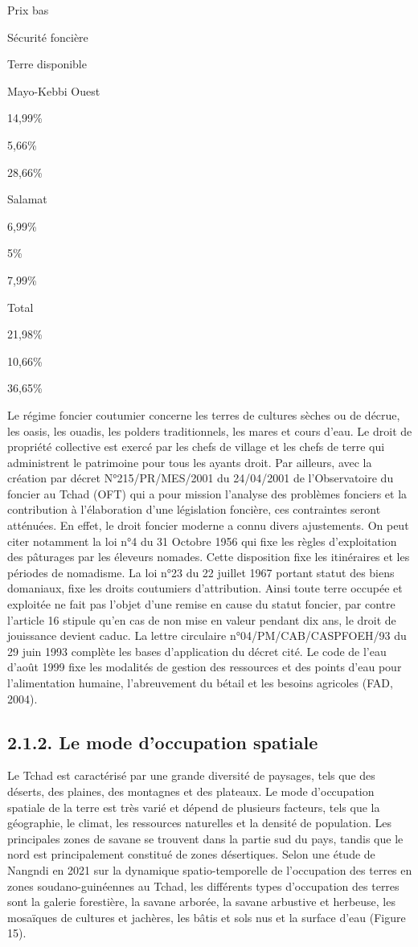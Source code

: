 \documentclass[12pt,oneside]{report}
\begin{document}
Prix bas

Sécurité foncière

Terre disponible

Mayo-Kebbi Ouest

14,99\%

5,66\%

28,66\%

Salamat

6,99\%

5\%

7,99\%

Total

21,98\%

10,66\%

36,65\%

Le régime foncier coutumier concerne les terres de cultures sèches ou de décrue, les oasis, les ouadis, les polders traditionnels, les mares et cours d’eau. Le droit de propriété collective est exercé par les chefs de village et les chefs de terre qui administrent le patrimoine pour tous les ayants droit. Par ailleurs, avec la création par décret N°215/PR/MES/2001 du 24/04/2001 de l'Observatoire du foncier au Tchad (OFT) qui a pour mission l'analyse des problèmes fonciers et la contribution à l'élaboration d'une législation foncière, ces contraintes seront atténuées. En effet, le droit foncier moderne a connu divers ajustements. On peut citer notamment la loi n°4 du 31 Octobre 1956 qui fixe les règles d’exploitation des pâturages par les éleveurs nomades. Cette disposition fixe les itinéraires et les périodes de nomadisme. La loi n°23 du                                                                     22 juillet 1967 portant statut des biens domaniaux, fixe les droits coutumiers d’attribution. Ainsi toute terre occupée et exploitée ne fait pas l’objet d’une remise en cause du statut foncier, par contre l’article 16 stipule qu’en cas de non mise en valeur pendant dix ans, le droit de jouissance devient caduc. La lettre circulaire n°04/PM/CAB/CASPFOEH/93 du 29 juin 1993 complète les bases d’application du décret cité. Le code de l’eau d’août 1999 fixe les modalités de gestion des ressources et des points d’eau pour l’alimentation humaine, l’abreuvement du bétail et les besoins agricoles (FAD, 2004).

\subsection{2.1.2. Le mode d’occupation spatiale}
Le Tchad est caractérisé par une grande diversité de paysages, tels que des déserts, des plaines, des montagnes et des plateaux. Le mode d'occupation spatiale de la terre est très varié et dépend de plusieurs facteurs, tels que la géographie, le climat, les ressources naturelles et la densité de population. Les principales zones de savane se trouvent dans la partie sud du pays, tandis que le nord est principalement constitué de zones désertiques. Selon une étude de Nangndi en 2021 sur la dynamique spatio-temporelle de l'occupation des terres en zones soudano-guinéennes au Tchad, les différents types d’occupation des terres sont la galerie forestière, la savane arborée, la savane arbustive et herbeuse, les mosaïques de cultures et jachères, les bâtis et sols nus et la surface d'eau (Figure 15).
\end{document}
